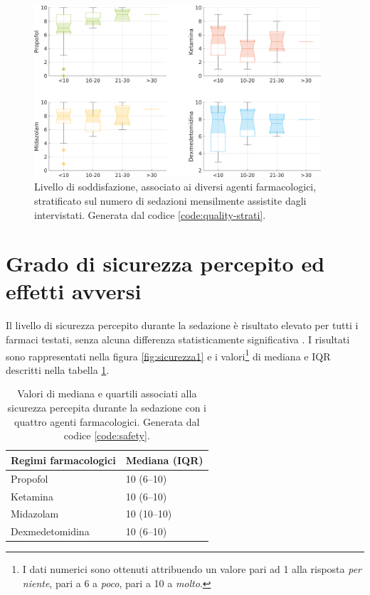 \vfill

\newpage

\begin{figure}[!ht]
    \centering
    \includegraphics[width=0.95\textwidth]{Figure/qualita-strat-frequenza.png}
    \caption{Livello di soddisfazione, associato ai diversi agenti farmacologici, stratificato sul numero di sedazioni mensilmente assistite dagli intervistati. Generata dal codice \ref{code:quality-strati}.}
    \label{fig:qualitafrequenza}
\end{figure}

\section{Grado di sicurezza percepito ed effetti avversi}

Il livello di sicurezza percepito durante la sedazione è risultato elevato per tutti i farmaci testati, senza alcuna differenza statisticamente significativa {}. I risultati sono rappresentati nella figura \ref{fig:sicurezza1} e i valori\footnote{I dati numerici sono ottenuti attribuendo un valore pari ad 1 alla risposta \emph{per niente}, pari a 6 a \emph{poco}, pari a 10 a \emph{molto}.} di mediana e IQR descritti nella tabella \ref{tab:sicurezzased}.

\vfill

\bgroup
\def\arraystretch{1.5}
\begin{table}[ht]
    \centering
    \begin{tabular}{|l|l|}
         Regimi farmacologici & Mediana (IQR) \\ \hline
       Propofol & 10 (6--10)  \\
       Ketamina & 10 (6--10) \\
       Midazolam & 10 (10--10) \\
       Dexmedetomidina & 10 (6--10) 
    \end{tabular}
    \caption{Valori di mediana e quartili associati alla sicurezza percepita durante la sedazione con i quattro agenti farmacologici. Generata dal codice \ref{code:safety}.}
    \label{tab:sicurezzased}
\end{table}
\egroup

